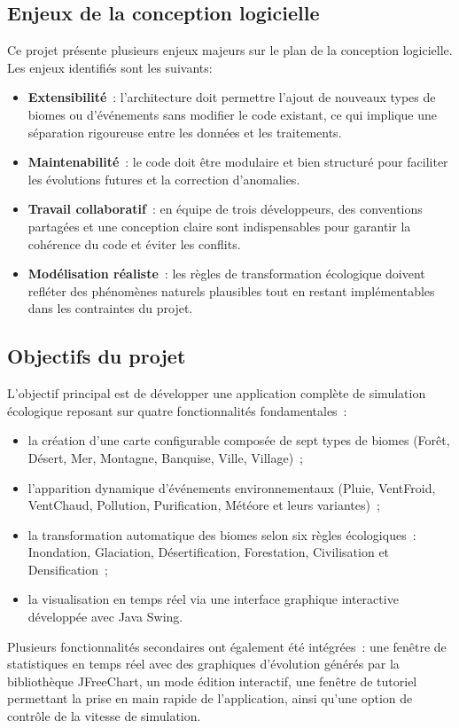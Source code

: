 \subsection{Enjeux de la conception logicielle}
\label{subsec:enjeux}

Ce projet présente plusieurs enjeux majeurs sur le plan de la conception logicielle.
Les enjeux identifiés sont les suivants: 

\begin{itemize}
  \item \textbf{Extensibilité}~: l'architecture doit permettre l'ajout de nouveaux
    types de biomes ou d'événements sans modifier le code existant, ce qui implique
    une séparation rigoureuse entre les données et les traitements.
  \item \textbf{Maintenabilité}~: le code doit être modulaire et bien structuré
    pour faciliter les évolutions futures et la correction d'anomalies.
  \item \textbf{Travail collaboratif}~: en équipe de trois développeurs, des
    conventions partagées et une conception claire sont indispensables pour garantir
    la cohérence du code et éviter les conflits.
  \item \textbf{Modélisation réaliste}~: les règles de transformation écologique
    doivent refléter des phénomènes naturels plausibles tout en restant
    implémentables dans les contraintes du projet.
\end{itemize}

\subsection{Objectifs du projet}
\label{subsec:objectifs}

L'objectif principal est de développer une application complète de simulation
écologique reposant sur quatre fonctionnalités fondamentales~:

\begin{itemize}
  \item la création d'une carte configurable composée de sept types de biomes
    (Forêt, Désert, Mer, Montagne, Banquise, Ville, Village)~;
  \item l'apparition dynamique d'événements environnementaux (Pluie, VentFroid,
    VentChaud, Pollution, Purification, Météore et leurs variantes)~;
  \item la transformation automatique des biomes selon six règles écologiques~:
    Inondation, Glaciation, Désertification, Forestation, Civilisation
    et Densification~;
  \item la visualisation en temps réel via une interface graphique interactive
    développée avec Java Swing.
\end{itemize}
Plusieurs fonctionnalités secondaires ont également été intégrées~: une fenêtre de
statistiques en temps réel avec des graphiques d'évolution générés par la
bibliothèque JFreeChart, un mode édition interactif, une fenêtre de tutoriel
permettant la prise en main rapide de l'application, ainsi qu'une option de
contrôle de la vitesse de simulation.

